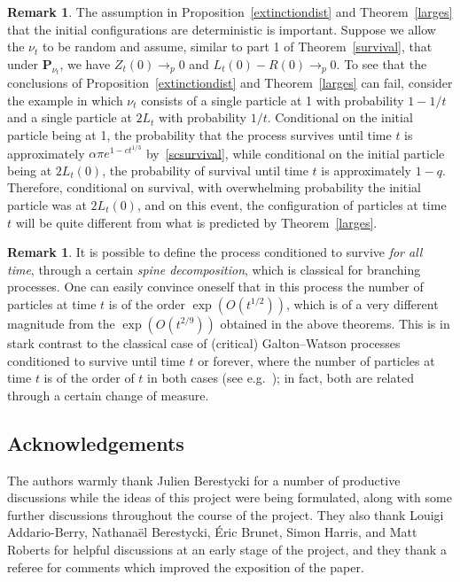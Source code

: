 \documentclass[10pt]{amsart}
\theoremstyle{definition}\newtheorem{defi}[theo]{Definition}\newtheorem{rema}[theo]{Remark}\newtheorem{exam}[theo]{Example}\newtheorem{exem}[theo]{Example}\newtheorem{nota}[theo]{Notation}
\renewcommand*\P{\mathbf{P}}
\newcommand{\1} {\mathds{1}}
\begin{document}
\begin{rema}
The assumption in Proposition~\ref{extinctiondist} and Theorem~\ref{larges} that the initial configurations are deterministic is important. Suppose we allow the $\nu_t$ to be random and assume, similar to part 1 of Theorem~\ref{survival}, that under $\P_{\nu_t}$, we have $Z_t(0) \rightarrow_p 0$ and $L_t(0) - R(0) \rightarrow_p 0$. To see that the conclusions of Proposition~\ref{extinctiondist} and Theorem~\ref{larges} can fail, consider the example in which $\nu_t$ consists of a single particle at 1 with probability $1 - 1/t$ and a single particle at $2L_t$ with probability $1/t$. Conditional on the initial particle being at 1, the probability that the process survives until time $t$ is approximately $\alpha \pi e^{1 - ct^{1/3}}$ by~\eqref{scsurvival}, while conditional on the initial particle being at $2L_t(0)$, the probability of survival until time $t$ is approximately $1 - q$. Therefore, conditional on survival, with overwhelming probability the initial particle was at $2L_t(0)$, and on this event, the configuration of particles at time $t$ will be quite different from what is predicted by Theorem~\ref{larges}.
\end{rema}

\begin{rema}
It is possible to define the process conditioned to survive \emph{for all time}, through a certain \emph{spine decomposition}, which is classical for branching processes. One can easily convince oneself that in this process the number of particles at time $t$ is of the order $\exp(O(t^{1/2}))$, which is of a very different magnitude from the $\exp(O(t^{2/9}))$ obtained in the above theorems. This is in stark contrast to the classical case of (critical) Galton--Watson processes conditioned to survive until time $t$ or forever, where the number of particles at time $t$ is of the order of $t$ in both cases (see e.g.~\cite{lpp}); in fact, both are related through a certain change of measure.
\end{rema}

\subsection*{Acknowledgements}
The authors warmly thank Julien Berestycki for a number of productive discussions while the ideas of this project were being formulated, along with some further discussions throughout the course of the project. They also thank Louigi Addario-Berry, Nathana\"el Berestycki, Éric Brunet, Simon Harris, and Matt Roberts for helpful discussions at an early stage of the project, and they thank a referee for comments which improved the exposition of the paper. 
\end{document}
